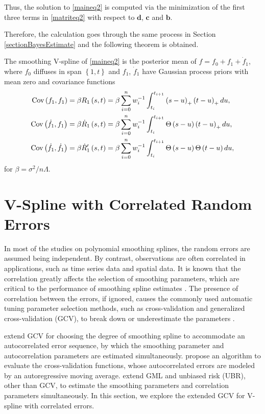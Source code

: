 Thus, the solution to \eqref{maineq2} is computed via the minimization of the first three terms in \eqref{matriteq2} with respect to $\mathbf{d}$, $\mathbf{c}$ and $\mathbf{b}$.

Therefore, the calculation goes through the same process in Section \ref{sectionBayesEstimate} and the following theorem is obtained. 
\begin{theorem}
The smoothing V-spline of \eqref{maineq2} is the posterior mean of $f=f_0+f_1 + \dot{f}_1$, where $f_0$ diffuses in span $\left\lbrace 1,t\right\rbrace$ and $f_1$, $\dot{f}_1$ have Gaussian process priors with mean zero and covariance functions
\begin{align}
\mathrm{Cov} \left(f_1,f_1\right)   &= \beta R_1\left(s,t\right)  =\beta \sum_{i=0}^n w_i^{-1} \int_{t_i}^{t_{i+1}} \left(s-u\right)_+\left(t-u\right)_+du, \\
\mathrm{Cov} \left(\dot{f}_1,f_1\right)  &= \beta \dot{R}_1\left(s,t\right) =\beta \sum_{i=0}^n w_i^{-1} \int_{t_i}^{t_{i+1}} \Theta\left(s-u\right)\left(t-u\right)_+du,\\
\mathrm{Cov} \left(\dot{f}_1,\dot{f}_1\right)  &= \beta \dot{R}'_1\left(s,t\right) =\beta \sum_{i=0}^n w_i^{-1} \int_{t_i}^{t_{i+1}} \Theta\left(s-u\right)\Theta\left(t-u\right)du,
\end{align}
for $\beta = \sigma^2/n\Lambda$.
\end{theorem}



\section{V-Spline with Correlated Random Errors}


In most of the studies on polynomial smoothing splines, the random errors are assumed being independent. By contrast,  observations are often correlated in applications, such as time series data and spatial data. It is known that the correlation greatly affects the selection of smoothing parameters, which are critical to the performance of smoothing spline estimates \citep{wang1998smoothing}. The presence of correlation
between the errors, if ignored, causes the commonly used automatic tuning parameter selection methods, such as cross-validation and generalized cross-validation (GCV), to break down or underestimate the parameters \citep{opsomer2001nonparametric}. 


\cite{diggle1989spline} extend GCV for choosing the degree of smoothing spline to accommodate an autocorrelated error sequence, by which the smoothing parameter and autocorrelation parameters are estimated simultaneously.  \cite{kohn1992nonparametric} propose an algorithm to evaluate the cross-validation functions, whose autocorrelated errors are modeled by an autoregressive moving average. \cite{wang1998smoothing} extend GML and unbiased risk (UBR), other than GCV, to estimate the smoothing parameters and correlation parameters simultaneously. In this section, we explore the extended GCV for V-spline with correlated errors. 



